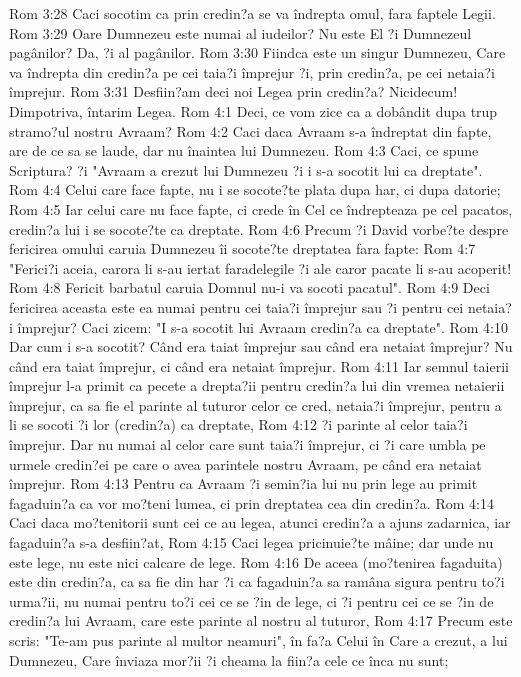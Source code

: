 Rom 3:28  Caci socotim ca prin credin?a se va îndrepta omul, fara faptele Legii.
Rom 3:29  Oare Dumnezeu este numai al iudeilor? Nu este El ?i Dumnezeul pagânilor? Da, ?i al pagânilor.
Rom 3:30  Fiindca este un singur Dumnezeu, Care va îndrepta din credin?a pe cei taia?i împrejur ?i, prin credin?a, pe cei netaia?i împrejur.
Rom 3:31  Desfiin?am deci noi Legea prin credin?a? Nicidecum! Dimpotriva, întarim Legea.
Rom 4:1  Deci, ce vom zice ca a dobândit dupa trup stramo?ul nostru Avraam?
Rom 4:2  Caci daca Avraam s-a îndreptat din fapte, are de ce sa se laude, dar nu înaintea lui Dumnezeu.
Rom 4:3  Caci, ce spune Scriptura? ?i "Avraam a crezut lui Dumnezeu ?i i s-a socotit lui ca dreptate".
Rom 4:4  Celui care face fapte, nu i se socote?te plata dupa har, ci dupa datorie;
Rom 4:5  Iar celui care nu face fapte, ci crede în Cel ce îndrepteaza pe cel pacatos, credin?a lui i se socote?te ca dreptate.
Rom 4:6  Precum ?i David vorbe?te despre fericirea omului caruia Dumnezeu îi socote?te dreptatea fara fapte:
Rom 4:7  "Ferici?i aceia, carora li s-au iertat faradelegile ?i ale caror pacate li s-au acoperit!
Rom 4:8  Fericit barbatul caruia Domnul nu-i va socoti pacatul".
Rom 4:9  Deci fericirea aceasta este ea numai pentru cei taia?i împrejur sau ?i pentru cei netaia?i împrejur? Caci zicem: "I s-a socotit lui Avraam credin?a ca dreptate".
Rom 4:10  Dar cum i s-a socotit? Când era taiat împrejur sau când era netaiat împrejur? Nu când era taiat împrejur, ci când era netaiat împrejur.
Rom 4:11  Iar semnul taierii împrejur l-a primit ca pecete a drepta?ii pentru credin?a lui din vremea netaierii împrejur, ca sa fie el parinte al tuturor celor ce cred, netaia?i împrejur, pentru a li se socoti ?i lor (credin?a) ca dreptate,
Rom 4:12  ?i parinte al celor taia?i împrejur. Dar nu numai al celor care sunt taia?i împrejur, ci ?i care umbla pe urmele credin?ei pe care o avea parintele nostru Avraam, pe când era netaiat împrejur.
Rom 4:13  Pentru ca Avraam ?i semin?ia lui nu prin lege au primit fagaduin?a ca vor mo?teni lumea, ci prin dreptatea cea din credin?a.
Rom 4:14  Caci daca mo?tenitorii sunt cei ce au legea, atunci credin?a a ajuns zadarnica, iar fagaduin?a s-a desfiin?at,
Rom 4:15  Caci legea pricinuie?te mâine; dar unde nu este lege, nu este nici calcare de lege.
Rom 4:16  De aceea (mo?tenirea fagaduita) este din credin?a, ca sa fie din har ?i ca fagaduin?a sa ramâna sigura pentru to?i urma?ii, nu numai pentru to?i cei ce se ?in de lege, ci ?i pentru cei ce se ?in de credin?a lui Avraam, care este parinte al nostru al tuturor,
Rom 4:17  Precum este scris: "Te-am pus parinte al multor neamuri", în fa?a Celui în Care a crezut, a lui Dumnezeu, Care înviaza mor?ii ?i cheama la fiin?a cele ce înca nu sunt;
